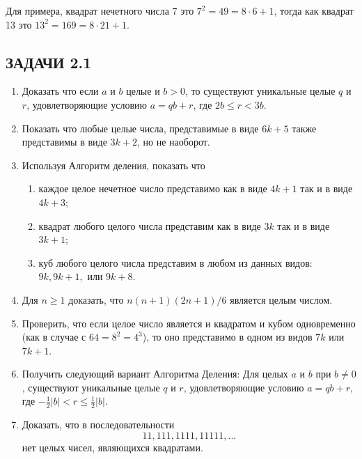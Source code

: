 \documentclass[11pt]{article}
\begin{document}
Для примера, квадрат нечетного числа 7 это $7^2=49=8\cdot 6+1$, тогда как квадрат 13 это $13^2=169=8\cdot 21+1$.
\begin{center}
	\section*{ЗАДАЧИ 2.1}
\end{center}
\begin{enumerate}\leftskip=-0.9cm \rightskip=-0.9cm
	\item Доказать что если $a$ и $b$ целые и $b>0$, то существуют уникальные целые $q$ и $r$, удовлетворяющие условию $a=qb+r$, где $2b\leq r<3b$. 
	\item Показать что любые целые числа, представимые в виде $6k+5$ также представимы в виде $3k+2$, но не наоборот.
	\item Используя Алгоритм деления, показать что
	\begin{enumerate}
		\item каждое целое нечетное число представимо как в виде $4k+1$ так и в виде $4k+3$;\\
		\item квадрат любого целого числа представим как в виде $3k$ так и в виде $3k+1$;\\
		\item куб любого целого числа представим в любом из данных видов: $9k, 9k+1,$ или $9k+8$.
	\end{enumerate}
	\item Для $n\geq 1$ доказать, что $n(n+1)(2n+1)/6$ является целым числом.
	\item Проверить, что если целое число является и квадратом и кубом одновременно (как в случае с $64=8^2=4^3$), то оно представимо в одном из видов $7k$ или $7k+1$.
	\item Получить следующий вариант Алгоритма Деления: Для целых $a$ и $b$ при $b\neq 0$, существуют уникальные целые $q$ и $r$, удовлетворяющие условию $a=qb+r$, где $-\frac{1}{2}|b|<r\leq \frac{1}{2}|b|$.\; [\textit{Подсказка:} Сначала следует записать $a=q'b+r'$, где $0\leq r'<|b|$. При $0\leq r'\leq \frac{1}{2}|b|$, пусть $r=r'$ и $q=q'$; при $\frac{1}{2}b<r'<|b|$, пусть $r=r'-|b|$ и $q=q'+1$, если $b>0$ или $q=q'-1$, если $b<0$.]
	\item Доказать, что в последовательности
		\[11, 111, 1111, 11111,...\]
	нет целых чисел, являющихся квадратами.\; [\textit{Подсказка:} Выражение $111...111$ может быть записано как $111...111=111...108+3=4k+3$.]
\end{enumerate}
\thispagestyle{4}
\end{document}
